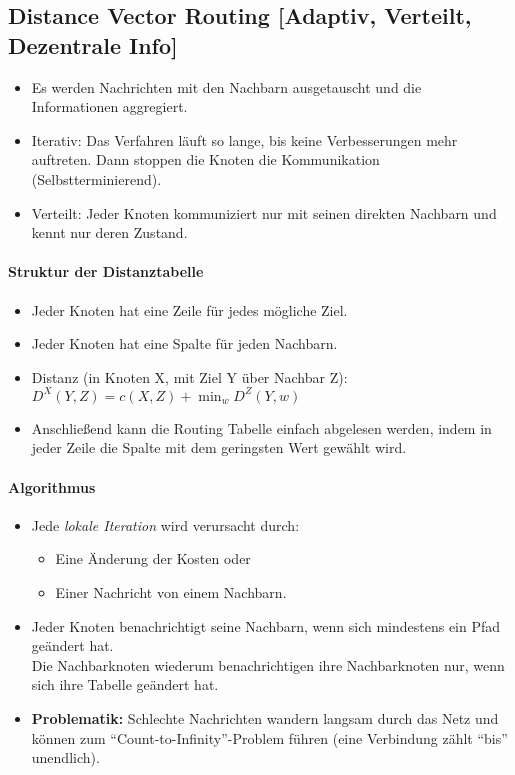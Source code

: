         \subsection{Distance Vector Routing [Adaptiv, Verteilt, Dezentrale Info]}
            \begin{itemize}
            	\item Es werden Nachrichten mit den Nachbarn ausgetauscht und die Informationen aggregiert.
            	\item Iterativ: Das Verfahren läuft so lange, bis keine Verbesserungen mehr auftreten. Dann stoppen die Knoten die Kommunikation (Selbstterminierend).
            	\item Verteilt: Jeder Knoten kommuniziert nur mit seinen direkten Nachbarn und kennt nur deren Zustand.
            \end{itemize}
            
            \paragraph{Struktur der Distanztabelle}
                \begin{itemize}
                	\item Jeder Knoten hat eine Zeile für jedes mögliche Ziel.
                	\item Jeder Knoten hat eine Spalte für jeden Nachbarn.
                	\item Distanz (in Knoten X, mit Ziel Y über Nachbar Z): \( D ^ X (Y, Z) = c(X, Z) + \min _ w { D ^ Z (Y, w) } \)
                	\item Anschließend kann die Routing Tabelle einfach abgelesen werden, indem in jeder Zeile die Spalte mit dem geringsten Wert gewählt wird.
                \end{itemize}
            
            \paragraph{Algorithmus}
                \begin{itemize}
                	\item Jede \textit{lokale Iteration} wird verursacht durch:
	                	\begin{itemize}
	                		\item Eine Änderung der Kosten oder
	                		\item Einer Nachricht von einem Nachbarn.
	                	\end{itemize}
	                \item Jeder Knoten benachrichtigt seine Nachbarn, wenn sich mindestens ein Pfad geändert hat. \\ Die Nachbarknoten wiederum benachrichtigen ihre Nachbarknoten nur, wenn sich ihre Tabelle geändert hat.
	                \item \textbf{Problematik:} Schlechte Nachrichten wandern langsam durch das Netz und können zum \enquote{Count-to-Infinity}-Problem führen (eine Verbindung zählt \enquote{bis} unendlich).
                \end{itemize}
                
